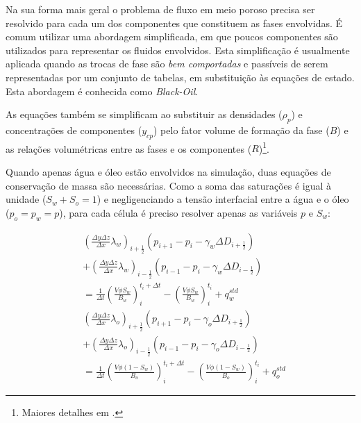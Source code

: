 \documentclass[final,5p]{elsarticle}
\numberwithin{equation}{section}
\begin{document}
        Na sua forma mais geral o problema de fluxo em meio poroso precisa ser resolvido para cada um dos componentes que constituem as fases envolvidas. É comum utilizar uma abordagem simplificada, em que poucos componentes são utilizados para representar os fluidos envolvidos. Esta simplificação é usualmente aplicada quando as trocas de fase são \emph{bem comportadas} e passíveis de serem representadas por um conjunto de tabelas, em substituição às equações de estado. Esta abordagem é conhecida como \emph{Black-Oil}.

        As equações também se simplificam ao substituir as densidades ($\rho_p$) e concentrações de componentes ($y_{cp}$) pelo fator volume de formação da fase ($B$) e as relações volumétricas entre as fases e os componentes ($R$)\footnote{Maiores detalhes em \cite{dake1983fundamentals}.}.

        Quando apenas água e óleo estão envolvidos na simulação, duas equações de conservação de massa são necessárias. Como a soma das saturações é igual à unidade ($S_w + S_o = 1$) e negligenciando a tensão interfacial entre a água e o óleo ($p_o = p_w = p$), para cada célula é preciso resolver apenas as variáveis $p$ e $S_w$:

        \begin{align}
            &\left( \frac{\Delta y \Delta z}{\Delta x} \lambda_w \right)_{i+\tfrac{1}{2}} (p_{i+1} - p_{i} - \gamma_w \Delta D_{i+\tfrac{1}{2}})  \nonumber \\
            &+ \left( \frac{\Delta y \Delta z}{\Delta x} \lambda_w \right)_{i-\tfrac{1}{2}} (p_{i-1} - p_{i} - \gamma_w \Delta D_{i-\tfrac{1}{2}}) \nonumber \\
            &  = \frac{1}{\Delta t} \left(\frac{V \phi S_w}{B_w}\right)_i^{t_i+\Delta t} - \left(\frac{V \phi S_w}{B_w}\right)_i^{t_i} + q^{std}_w \label{eq:blackoilumdw} \\
            &\left( \frac{\Delta y \Delta z}{\Delta x} \lambda_o \right)_{i+\tfrac{1}{2}} (p_{i+1} - p_{i} - \gamma_o \Delta D_{i+\tfrac{1}{2}})  \nonumber \\
            &+ \left( \frac{\Delta y \Delta z}{\Delta x} \lambda_o \right)_{i-\tfrac{1}{2}} (p_{i-1} - p_{i} - \gamma_o \Delta D_{i-\tfrac{1}{2}}) \nonumber \\
            &  = \frac{1}{\Delta t} \left(\frac{V \phi (1-S_w)}{B_o}\right)_i^{t_i+\Delta t} - \left(\frac{V \phi (1-S_w)}{B_o}\right)_i^{t_i} + q^{std}_o \label{eq:blackoilumdo}
        \end{align}
\end{document}

